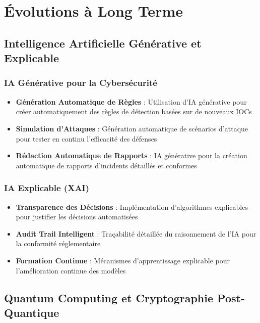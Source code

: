 \section{Évolutions à Long Terme}

\subsection{Intelligence Artificielle Générative et Explicable}

\subsubsection{IA Générative pour la Cybersécurité}

\begin{itemize}
    \item \textbf{Génération Automatique de Règles} : Utilisation d'IA générative pour créer automatiquement des règles de détection basées sur de nouveaux IOCs
    \item \textbf{Simulation d'Attaques} : Génération automatique de scénarios d'attaque pour tester en continu l'efficacité des défenses
    \item \textbf{Rédaction Automatique de Rapports} : IA générative pour la création automatique de rapports d'incidents détaillés et conformes
\end{itemize}

\subsubsection{IA Explicable (XAI)}

\begin{itemize}
    \item \textbf{Transparence des Décisions} : Implémentation d'algorithmes explicables pour justifier les décisions automatisées
    \item \textbf{Audit Trail Intelligent} : Traçabilité détaillée du raisonnement de l'IA pour la conformité réglementaire
    \item \textbf{Formation Continue} : Mécanismes d'apprentissage explicable pour l'amélioration continue des modèles
\end{itemize}

\subsection{Quantum Computing et Cryptographie Post-Quantique}

